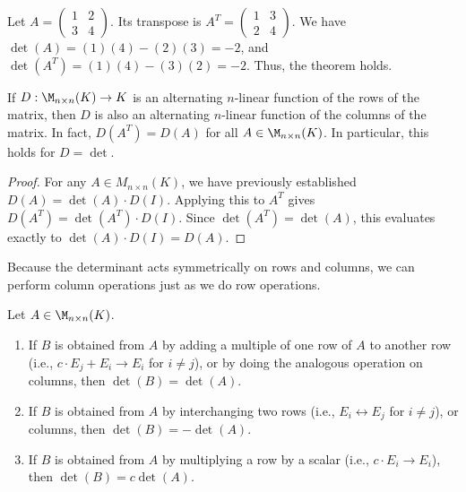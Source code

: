 \begin{example}
  Let $A = \left(\begin{smallmatrix} 1 & 2 \\ 3 & 4 \end{smallmatrix}\right)$. Its transpose is $A^T = \left(\begin{smallmatrix} 1 & 3 \\ 2 & 4 \end{smallmatrix}\right)$. We have $\det(A) = (1)(4) - (2)(3) = -2$, and $\det(A^T) = (1)(4) - (3)(2) = -2$. Thus, the theorem holds.
\end{example}

\begin{corollary}
  \label{cor:det_columns}
  If $D : \M_{n \times n}(K) \to K$ is an alternating $n$-linear function of the rows of the matrix, then $D$ is also an alternating $n$-linear function of the columns of the matrix. In fact, $D(A^T) = D(A)$ for all $A \in \M_{n \times n}(K)$. In particular, this holds for $D = \det$.
\end{corollary}

\begin{proof}
  For any $A \in M_{n \times n}(K)$, we have previously established $D(A) = \det(A) \cdot D(I)$. Applying this to $A^T$ gives $D(A^T) = \det(A^T) \cdot D(I)$. Since $\det(A^T) = \det(A)$, this evaluates exactly to $\det(A) \cdot D(I) = D(A)$.
\end{proof}

Because the determinant acts symmetrically on rows and columns, we can perform column operations just as we do row operations.

\begin{theorem}
  \label{thm:row_operations}
  Let $A \in \M_{n \times n}(K)$.
  \begin{enumerate}
    \item If $B$ is obtained from $A$ by adding a multiple of one row of $A$ to another row (i.e., $c \cdot E_j + E_i \to E_i$ for $i \neq j$), or by doing the analogous operation on columns, then $\det(B) = \det(A)$.
    \item If $B$ is obtained from $A$ by interchanging two rows (i.e., $E_i \leftrightarrow E_j$ for $i \neq j$), or columns, then $\det(B) = -\det(A)$.
    \item If $B$ is obtained from $A$ by multiplying a row by a scalar (i.e., $c \cdot E_i \to E_i$), then $\det(B) = c \det(A)$.
  \end{enumerate}
\end{theorem}

